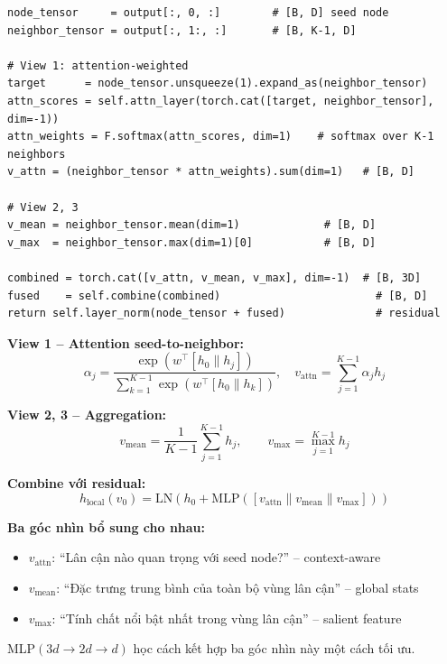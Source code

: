\documentclass[12pt,a4paper]{article}
\begin{document}
\begin{codebox}[title={local\_module.py -- MultiViewReadout.forward()}]
\begin{lstlisting}
node_tensor     = output[:, 0, :]        # [B, D] seed node
neighbor_tensor = output[:, 1:, :]       # [B, K-1, D]

# View 1: attention-weighted
target      = node_tensor.unsqueeze(1).expand_as(neighbor_tensor)
attn_scores = self.attn_layer(torch.cat([target, neighbor_tensor], dim=-1))
attn_weights = F.softmax(attn_scores, dim=1)    # softmax over K-1 neighbors
v_attn = (neighbor_tensor * attn_weights).sum(dim=1)   # [B, D]

# View 2, 3
v_mean = neighbor_tensor.mean(dim=1)             # [B, D]
v_max  = neighbor_tensor.max(dim=1)[0]           # [B, D]

combined = torch.cat([v_attn, v_mean, v_max], dim=-1)  # [B, 3D]
fused    = self.combine(combined)                        # [B, D]
return self.layer_norm(node_tensor + fused)              # residual
\end{lstlisting}
\end{codebox}

\begin{mathbox}[title={Công thức Multi-View Readout}]
\textbf{View 1 -- Attention seed-to-neighbor:}
\begin{equation}
  \alpha_j = \frac{\exp(w^\top [h_0 \| h_j])}{\sum_{k=1}^{K-1} \exp(w^\top [h_0 \| h_k])},
  \quad v_\text{attn} = \sum_{j=1}^{K-1} \alpha_j h_j
  \label{eq:mvr_attn}
\end{equation}

\textbf{View 2, 3 -- Aggregation:}
\begin{equation}
  v_\text{mean} = \frac{1}{K-1}\sum_{j=1}^{K-1} h_j, \qquad
  v_\text{max}  = \max_{j=1}^{K-1} h_j
  \label{eq:mvr_pool}
\end{equation}

\textbf{Combine với residual:}
\begin{equation}
  \boxed{h_\text{local}(v_0) = \text{LN}\!\left(
    h_0 + \text{MLP}\!\left([v_\text{attn} \| v_\text{mean} \| v_\text{max}]\right)
  \right)}
  \label{eq:mvr_out}
\end{equation}
\end{mathbox}

\begin{insightbox}
\textbf{Ba góc nhìn bổ sung cho nhau:}
\begin{itemize}[nosep]
  \item $v_\text{attn}$: ``Lân cận nào quan trọng với seed node?'' -- context-aware
  \item $v_\text{mean}$: ``Đặc trưng trung bình của toàn bộ vùng lân cận'' -- global stats
  \item $v_\text{max}$: ``Tính chất nổi bật nhất trong vùng lân cận'' -- salient feature
\end{itemize}
MLP$(3d \to 2d \to d)$ học cách kết hợp ba góc nhìn này một cách tối ưu.
\end{insightbox}
\end{document}
